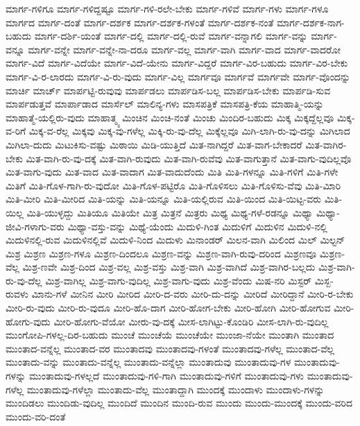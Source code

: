 {ಮಾರ್ಗ-ಗಳಿಗೂ
ಮಾರ್ಗ-ಗಳಿದ್ದಷ್ಟೂ
ಮಾರ್ಗ-ಗಳಿ-ರಲೇ-ಬೇಕು
ಮಾರ್ಗ-ಗಳಿವೆ
ಮಾರ್ಗ-ಗಳು
ಮಾರ್ಗ-ಗಳೂ
ಮಾರ್ಗದ
ಮಾರ್ಗ-ದಂತೆ
ಮಾರ್ಗ-ದರ್ಶಕ
ಮಾರ್ಗ-ದರ್ಶಕ-ಗಳಂತೆ
ಮಾರ್ಗ-ದರ್ಶಕ-ನಂತೆ
ಮಾರ್ಗ-ದರ್ಶಕ-ನಾಗ-ಬಹುದು
ಮಾರ್ಗ-ದರ್ಶಿ-ಯಂತೆ
ಮಾರ್ಗ-ದಲ್ಲಿ
ಮಾರ್ಗ-ದಲ್ಲಿ-ರುವೆ
ಮಾರ್ಗ-ವನ್ನಾಗಲಿ
ಮಾರ್ಗ-ವನ್ನು
ಮಾರ್ಗ-ವನ್ನೂ
ಮಾರ್ಗ-ವನ್ನೇ
ಮಾರ್ಗ-ವನ್ನೇ-ನಾ-ದರೂ
ಮಾರ್ಗ-ವಲ್ಲ
ಮಾರ್ಗ-ವಾಗಿ
ಮಾರ್ಗ-ವಾದ
ಮಾರ್ಗ-ವಾದರೋ
ಮಾರ್ಗ-ವಿದೆ
ಮಾರ್ಗ-ವಿದೆಯೇ
ಮಾರ್ಗ-ವಿದೆ-ಯೇನು
ಮಾರ್ಗ-ವಿದ್ದರೆ
ಮಾರ್ಗ-ವಿರ-ಬಹುದು
ಮಾರ್ಗ-ವಿರ-ಬೇಕು
ಮಾರ್ಗ-ವಿ-ರ-ಲಾರದು
ಮಾರ್ಗ-ವಿ-ರು-ವುದು
ಮಾರ್ಗ-ವಿಲ್ಲ
ಮಾರ್ಗವೂ
ಮಾರ್ಗವೆ
ಮಾರ್ಗವೇ
ಮಾರ್ಗ-ವೊಂದನ್ನು
ಮಾರ್ಚಿ
ಮಾರ್ಚ್
ಮಾರ್ಪಟ್ಟಿ-ರುವುವು
ಮಾರ್ಪಡಲು
ಮಾರ್ಪಡಿಸ-ಬಲ್ಲ
ಮಾರ್ಪಡಿಸ-ಬೇಕು
ಮಾರ್ಪಡಿ-ಸುವ
ಮಾರ್ಪಡುತ್ತವೆ
ಮಾರ್ಪಾಡಾದ
ಮಾರ್ಸೆಲ್
ಮಾಲಿನ್ಯ-ಗಳು
ಮಾಸಪತ್ರಿಕೆ
ಮಾಸಪತ್ರಿ-ಕೆಯ
ಮಾಹಾತ್ಮಿ-ಯನ್ನು
ಮಾಹಾತ್ಮೆ-ಯಲ್ಲಿರು-ವುದು
ಮಾಹಾತ್ಮ್ಯ
ಮಿಂಚಿನ
ಮಿಂಚಿ-ನಂತೆ
ಮಿಂಚು
ಮಿಂದಿರ-ಬಹುದು
ಮಿಕ್ಕ
ಮಿಕ್ಕದ್ದೆಲ್ಲವೂ
ಮಿಕ್ಕ-ವ-ರಿಗೆ
ಮಿಕ್ಕ-ವ-ರೆಲ್ಲ
ಮಿಕ್ಕವು
ಮಿಕ್ಕ-ವು-ಗಳೆಲ್ಲ
ಮಿಕ್ಕಿ-ರು-ವು-ದೆಲ್ಲ
ಮಿಕ್ಕೆಲ್ಲವೂ
ಮಿಗಿ-ಲಾಗಿ-ರು-ವು-ದನ್ನು
ಮಿಗಿಲಾದ
ಮಿಗಿಲಾ-ದುದು
ಮಿಟುಕಿಸು-ವಷ್ಟು
ಮಿಠಾಯಿ
ಮಿಡಿ-ಯುತ್ತಿದೆ
ಮಿತ-ನಾಗಿದ್ದರೆ
ಮಿತ-ವಾಗ-ಬೇಕಾದರೆ
ಮಿತ-ವಾಗಿರ-ಬೇಕು
ಮಿತ-ವಾಗಿ-ರು-ವು-ದಕ್ಕೆ
ಮಿತ-ವಾಗಿ-ರುವುದು
ಮಿತ-ವಾಗಿ-ರುವೆವು
ಮಿತ-ವಾಗುತ್ತಾನೆ
ಮಿತ-ವಾಗು-ವುದಿಲ್ಲವೊ
ಮಿತ-ವಾಗು-ವುದು
ಮಿತ-ವಾದ
ಮಿತ-ವಾದಾಗ
ಮಿತ-ವಾದುದೆಂದು
ಮಿತಿ
ಮಿತಿ-ಗಳನ್ನೂ
ಮಿತಿ-ಗಳಿಗೆ
ಮಿತಿ-ಗಳೇ
ಮಿತಿಗೆ
ಮಿತಿ-ಗೊಳ-ಗಾಗಿ-ರು-ವುದೋ
ಮಿತಿ-ಗೊಳ-ಪಟ್ಟಿರೊ
ಮಿತಿ-ಗೊಳಿಸಲು
ಮಿತಿ-ಗೊಳಿಸು-ವೆವು
ಮಿತಿ-ಮಿಾರಿ
ಮಿತಿ-ಮೀರಿ
ಮಿತಿ-ಮೀರಿದ
ಮಿತಿ-ಯನ್ನು
ಮಿತಿ-ಯನ್ನೂ
ಮಿತಿ-ಯಲ್ಲಿರುವ
ಮಿತಿ-ಯಿಂದ
ಮಿತಿ-ಯಿಟ್ಟ-ವರು
ಮಿತಿ-ಯಿಲ್ಲ
ಮಿತಿ-ಯುಳ್ಳದ್ದು
ಮಿತಿಯೂ
ಮಿತಿಯೇ
ಮಿತ್ರ
ಮಿತ್ರನೆ
ಮಿತ್ರರು
ಮಿಥ್ಯ
ಮಿಥ್ಯ-ಗಳೆ-ರಡನ್ನೂ
ಮಿಥ್ಯಾ
ಮಿಥ್ಯಾ-ಜೀವಿ-ಗಳಾಗು-ವರು
ಮಿಥ್ಯಾ-ವಸ್ತು-ವನ್ನು
ಮಿಥ್ಯೆ-ಯೆಂದು
ಮಿದುಳಿ-ಗಿಂತ
ಮಿದುಳಿಗೆ
ಮಿದುಳಿನ
ಮಿದುಳಿ-ನಲ್ಲಿ
ಮಿದುಳಿನಲ್ಲಿ-ರುವ
ಮಿದುಳಿನಲ್ಲಿವೆ
ಮಿದುಳಿ-ನಿಂದ
ಮಿದುಳು
ಮಿನಾಂಡರ್
ಮಿಲನ-ವಾಗಿ
ಮಿಲಿಂದ
ಮಿಲ್
ಮಿಲ್ಟನ್
ಮಿಶ್ರ
ಮಿಶ್ರಣ
ಮಿಶ್ರಣ-ಗಳೂ
ಮಿಶ್ರಣ-ದಿಂದಲೂ
ಮಿಶ್ರಣ-ವನ್ನು
ಮಿಶ್ರಣ-ವಾಗಿ-ರುವು-ದರಿಂದ
ಮಿಶ್ರಣವೂ
ಮಿಶ್ರಣ-ವೆಲ್ಲ
ಮಿಶ್ರ-ಣವೇ
ಮಿಶ್ರ-ದಿಂದ
ಮಿಶ್ರ-ವಲ್ಲ
ಮಿಶ್ರ-ವಸ್ತು
ಮಿಶ್ರ-ವಾಗಿ
ಮಿಶ್ರ-ವಾಗಿದೆ
ಮಿಶ್ರ-ವಾಗಿರ-ಬಲ್ಲದು
ಮಿಶ್ರ-ವಾಗಿ-ರು-ವು-ದೆಲ್ಲ
ಮಿಶ್ರ-ವಾಗಿಲ್ಲ
ಮಿಶ್ರ-ವಾಗು-ವುದಿಲ್ಲ
ಮಿಶ್ರ-ವಾಗು-ವುದು
ಮಿಶ್ರ-ವೆಂದು
ಮಿಷ-ನರಿ
ಮಿಸ್ಟರ್
ಮಿಸ್ಬ-ರುವಳು
ಮಿಾನು-ಗಳೆ
ಮೀನಿನ
ಮೀರಿ
ಮೀರಿದ
ಮೀರಿ-ದ-ವರು
ಮೀರಿ-ದು-ದನ್ನು
ಮೀರಿದೆ
ಮೀರಿದ್ದಾನೆ
ಮೀರಿ-ರ-ಬೇಕು
ಮೀರಿ-ರು-ವುದು
ಮೀರಿ-ರು-ವುದೂ
ಮೀರಿ-ಹೊ-ದಾಗ
ಮೀರಿ-ಹೋಗ-ಬೇಕು
ಮೀರಿ-ಹೋಗಿ
ಮೀರಿ-ಹೋಗುವ
ಮೀರಿ-ಹೋಗು-ವುದು
ಮೀರಿ-ಹೋಗು-ವೆಯೋ
ಮೀರು-ವು-ದಕ್ಕೆ
ಮೀಸ-ಲಾಗಿಟ್ಟು-ಕೊಂಡಿರಿ
ಮೀಸ-ಲಾಗಿ-ರು-ವುದಿಲ್ಲ
ಮುಂಗೋಪಿ-ಗಳಲ್ಲ-ದಿರ-ಬಹುದು
ಮುಂಚೆ
ಮುಂಚೆಯೆ
ಮುಂಚೆಯೇ
ಮುಂಜಾ-ನೆಯೇ
ಮುಂತಾಗಿ
ಮುಂತಾದ
ಮುಂತಾದ-ವನ್ನೆಲ್ಲ
ಮುಂತಾದ-ವರ
ಮುಂತಾದವು
ಮುಂತಾದವು-ಗಳಂತೆ
ಮುಂತಾದವು-ಗಳೆಲ್ಲ
ಮುಂತಾದ-ವೆಲ್ಲ
ಮುಂತಾದು-ವನ್ನು
ಮುಂತಾದು-ವನ್ನೆಲ್ಲ
ಮುಂತಾದು-ವನ್ನೆಲ್ಲಾ
ಮುಂತಾದುವು
ಮುಂತಾದುವು-ಗಳ
ಮುಂತಾದುವು-ಗಳನ್ನು
ಮುಂತಾದುವು-ಗಳಲ್ಲದೆ
ಮುಂತಾದುವು-ಗಳಿ-ಗಾಗಿ
ಮುಂತಾದುವು-ಗಳಿಗೆ
ಮುಂತಾದುವು-ಗಳು
ಮುಂತಾದುವು-ಗಳೆಲ್ಲ
ಮುಂತಾದುವು-ಗಳೆಲ್ಲಾ
ಮುಂತಾದು-ವೆಲ್ಲ
ಮುಂತಾದ್ದಾಗಿ
ಮುಂದಕ್ಕೆ
ಮುಂದಾಳು
ಮುಂದಾಳು-ಗಳನ್ನು
ಮುಂದಿಡಲು
ಮುಂದಿಡು-ವುದಿಲ್ಲ
ಮುಂದಿದೆ
ಮುಂದಿನ
ಮುಂದಿ-ರುವ
ಮುಂದು
ಮುಂದು-ಮುಂದಕ್ಕೆ
ಮುಂದು-ವರಿದ
ಮುಂದು-ವರಿ-ದಂತೆ
}
